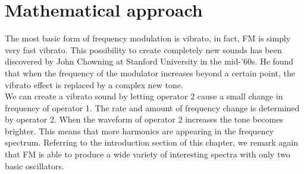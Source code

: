 \section{Mathematical approach}
The most basic form of frequency modulation is vibrato, in fact, FM is simply very fast vibrato. This possibility to create completely new sounds has been discovered by John Chowning at Stanford University in the mid-'60s. He found that when the frequency of the modulator increases beyond a certain point, the vibrato effect is replaced by a complex new tone. \\
We can create a vibrato sound by letting operator 2 cause a small change in frequency of operator 1. The rate and amount of frequency change is determined by operator 2. When the waveform of operator 2 increases the tone becomes brighter. This means that more harmonics are appearing in the frequency spectrum. Referring to the introduction section of this chapter, we remark again that FM is able to produce a wide variety of interesting spectra with only two basic oscillators. \\

